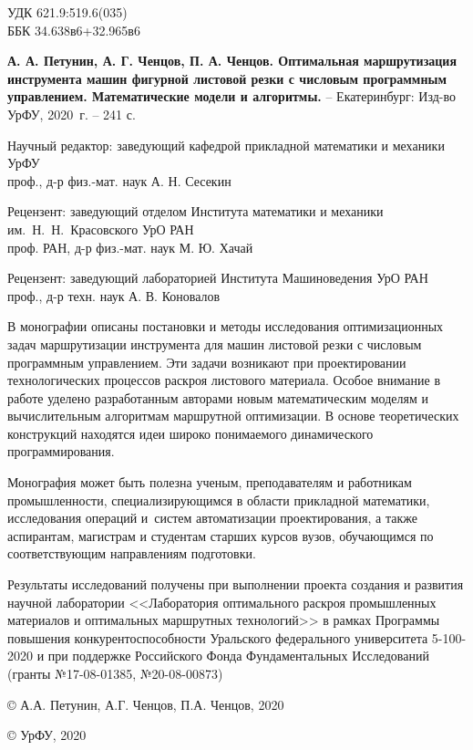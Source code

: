 
\thispagestyle{empty}
{
\setlength{\parindent}{0pt}
\setlength{\parskip}{1em}
\footnotesize

\noindent
УДК  621.9:519.6(035)
\\
ББК  34.638в6+32.965в6

\vspace{2em}

{\bf
А. А. Петунин,
А. Г. Ченцов,
П. А. Ченцов.
Оптимальная маршрутизация инструмента машин фигурной листовой резки
с числовым программным управлением.
Математические модели и алгоритмы.
}
--
Екатеринбург:
Изд-во УрФУ,
2020~г.
--
241 с.

\vspace{2em}

\begin{center}

Научный редактор:
заведующий кафедрой прикладной математики и механики УрФУ
\\
проф., д-р физ.-мат. наук А. Н. Сесекин

Рецензент:
заведующий отделом
Института математики и механики им.~Н.~Н.~Красовского УрО РАН
\\
проф. РАН, д-р физ.-мат. наук М. Ю. Хачай

Рецензент:
заведующий лабораторией Института Машиноведения УрО РАН
\\
проф., д-р техн. наук А. В. Коновалов
\end{center}

\vspace{1em}

В монографии
описаны постановки и методы исследования оптимизационных задач
маршрутизации инструмента для машин листовой резки
с числовым программным управлением.
Эти задачи возникают при проектировании технологических процессов
раскроя листового материала.
Особое внимание в работе уделено разработанным авторами
новым математическим моделям и вычислительным алгоритмам маршрутной оптимизации.
В основе теоретических конструкций находятся идеи
широко понимаемого динамического программирования.

Монография может быть полезна ученым, преподавателям и работникам промышленности,
специализирующимся в области прикладной математики,
исследования операций и~систем автоматизации проектирования,
а также аспирантам, магистрам и студентам старших курсов вузов,
обучающимся по соответствующим направлениям подготовки.

Результаты исследований получены при выполнении
проекта создания и развития научной лаборатории
<<Лаборатория оптимального раскроя промышленных материалов
и оптимальных маршрутных технологий>>
в рамках Программы повышения конкурентоспособности
Уральского федерального университета
5-100-2020
и при поддержке Российского Фонда Фундаментальных Исследований
(гранты №17-08-01385, №20-08-00873)

\vspace{3em}
{
\setlength{\parindent}{0.5\linewidth}
\setlength{\parskip}{0em}
\scriptsize

\copyright
А.А. Петунин, А.Г. Ченцов, П.А. Ченцов, 2020

\copyright
УрФУ,
2020
}}
